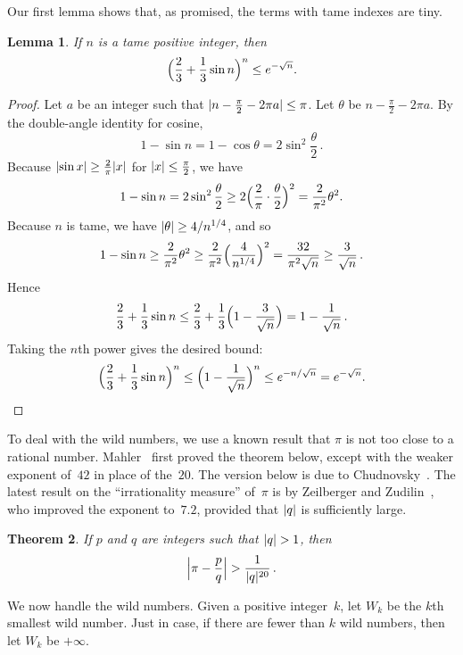 \documentclass[12pt]{article}
\theoremstyle{plain}
\newtheorem{theorem}{Theorem}
\newtheorem{lemma}[theorem]{Lemma}
\DeclarePairedDelimiter\abs{\lvert}{\rvert}
\begin{document}
Our first lemma shows that, as promised, the terms with tame indexes are tiny.  

\begin{lemma} \label{lemma:tame}
If $n$ is a tame positive integer, then 
\[
  \Bigl( \frac{2}{3} + \frac{1}{3} \sin n \Bigr)^n \le e^{- \sqrt{n}} . 
\]
\end{lemma}

\begin{proof} 
Let $a$ be an integer such that $\abs{ n - \frac{\pi}{2} - 2 \pi a } \le \pi$.
Let $\theta$ be $n - \frac{\pi}{2} - 2 \pi a$.
By the double-angle identity for cosine, 
\[
  1 - \sin n 
	  = 1 - \cos \theta 
		= 2 \sin^2 \frac{\theta}{2} \, .
\]
Because $\abs{\sin x} \ge \frac{2}{\pi} \abs{x}$ for $\abs{x} \le \frac{\pi}{2}$, we have
\[
  1 - \sin n 
	  = 2 \sin^2 \frac{\theta}{2} 
	  \ge 2 \Bigl( \frac{2}{\pi} \cdot \frac{\theta}{2} \Bigr)^2 
		= \frac{2}{\pi^2} \theta^2 .
\]
Because $n$ is tame, we have $\abs{\theta} \ge 4 / n^{1/4}$, and so
\[
  1 - \sin n 
		\ge \frac{2}{\pi^2} \theta^2 
		\ge \frac{2}{\pi^2} \Bigl( \frac{4}{n^{1/4}} \Bigr)^2
		= \frac{32}{\pi^2 \sqrt{n}}
		\ge \frac{3}{\sqrt{n}} \, .
\]
Hence 
\[
  \frac{2}{3} + \frac{1}{3} \sin n
	  \le \frac{2}{3} + \frac{1}{3} \Bigl( 1 - \frac{3}{\sqrt{n}} \Bigr)
		= 1 - \frac{1}{\sqrt{n}} \, .
\]
Taking the $n$th power gives the desired bound:
\[
  \Bigl( \frac{2}{3} + \frac{1}{3} \sin n \Bigr)^n
	  \le \Bigl( 1 - \frac{1}{\sqrt{n}} \Bigr)^n
		\le e^{- n / \sqrt{n}}
		= e^{- \sqrt{n}} .  \qedhere
\]
\end{proof}

To deal with the wild numbers, 
we use a known result that $\pi$ is not too close to a rational number.
Mahler~\cite{Mahler} first proved the theorem below, 
except with the weaker exponent of~$42$ in place of the~$20$.  
The version below is due to Chudnovsky~\cite{Chudnovsky}.
The latest result on the ``irrationality measure'' of~$\pi$ is by Zeilberger and Zudilin~\cite{ZZ},
who improved the exponent to~$7.2$,
provided that $\abs{q}$ is sufficiently large.

\begin{theorem} \label{thm:Mahler}
If $p$ and $q$ are integers such that $\abs{q} > 1$, then
\[
  \abs[\Big]{ \pi - \frac{p}{q} } > \frac{1}{\abs{q}^{20}} \, .
\]
\end{theorem}

We now handle the wild numbers.
Given a positive integer~$k$, 
let $W_k$ be the $k$th smallest wild number.
Just in case,
if there are fewer than $k$ wild numbers,
then let $W_k$ be $+ \infty$.
\end{document}
